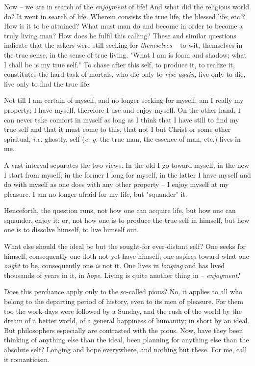 Now -- we are in search of the \textit{enjoyment} of life! And what did the 
religious world do? It went in search of life. Wherein consists the true life, 
the blessed life; etc.? How is it to be attained? What must man do and become 
in order to become a truly living man? How does he fulfil this calling? These 
and similar questions indicate that the askers were still seeking for 
\textit{themselves --} to wit, themselves in the true sense, in the sense of 
true living. "{}What I am is foam and shadow; what I shall be is my true 
self."{} To chase after this self, to produce it, to realize it, constitutes 
the hard task of mortals, who die only to \textit{rise again}, live only to 
die, live only to find the true life.

Not till I am certain of myself, and no longer seeking for myself, am I really 
my property; I have myself, therefore I use and enjoy myself. On the other 
hand, I can never take comfort in myself as long as I think that I have still 
to find my true self and that it must come to this, that not I but Christ or 
some other spiritual, \textit{i.e.} ghostly, self (\textit{e. g.} the true 
man, the essence of man, etc.) lives in me.

A vast interval separates the two views. In the old I go toward myself, in the 
new I start from myself; in the former I long for myself, in the latter I have 
myself and do with myself as one does with any other property -- I enjoy 
myself at my pleasure. I am no longer afraid for my life, but "{}squander"{} 
it.

Henceforth, the question runs, not how one can acquire life, but how one can 
squander, enjoy it; or, not how one is to produce the true self in himself, 
but how one is to dissolve himself, to live himself out.

What else should the ideal be but the sought-for ever-distant self? One seeks 
for himself, consequently one doth not yet have himself; one aspires toward 
what one \textit{ought} to be, consequently one \textit{is} not it. One lives 
in \textit{longing} and has lived thousands of years in it, in \textit{hope}. 
Living is quite another thing in -- \textit{enjoyment!}

Does this perchance apply only to the so-called pious? No, it applies to all 
who belong to the departing period of history, even to its men of pleasure. 
For them too the work-days were followed by a Sunday, and the rush of the 
world by the dream of a better world, of a general happiness of humanity; in 
short by an ideal. But philosophers especially are contrasted with the pious. 
Now, have they been thinking of anything else than the ideal, been planning 
for anything else than the absolute self? Longing and hope everywhere, and 
nothing but these. For me, call it romanticism.

